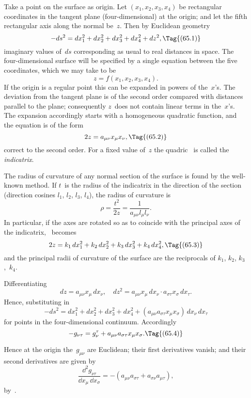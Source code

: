 \documentclass[12pt]{book}
\begin{document}
Take a point on the surface as origin. Let $(x_{1}, x_{2}, x_{3}, x_{4})$ be rectangular
coordinates in the tangent plane (four\hyp{}dimensional) at the origin; and let the
fifth rectangular axis along the normal be~$z$. Then by Euclidean geometry
\[
-ds^{2} = dx_{1}^{2} + dx_{2}^{2} + dx_{3}^{2} + dx_{4}^{2} + dz^{2},
\Tag{(65.1)}
\]
imaginary values of~$ds$ corresponding as usual to real distances in space. The
four\hyp{}dimensional surface will be specified by a single equation between the
five coordinates, which we may take to be
\[
z = f(x_{1}, x_{2}, x_{3}, x_{4}).
\]
If the origin is a regular point this can be expanded in powers of the~$x$'s. The
deviation from the tangent plane is of the second order compared with distances
parallel to the plane; consequently $z$~does not contain linear terms in
the~$x$'s. The expansion accordingly starts with a homogeneous quadratic
function, and the equation is of the form
\[
2z = a_{\mu\nu} x_{\mu} x_{\nu},
\Tag{(65.2)}
\]
correct to the second order. For a fixed value of~$z$ the quadric~ is called
the \emph{indicatrix}.
%

The radius of curvature of any normal section of the surface is found by
the well-known method. If $t$~is the radius of the indicatrix in the direction of
the section (direction cosines $l_{1}$, $l_{2}$, $l_{3}$, $l_{4}$), the radius of curvature is
\[
\rho = \frac{t^{2}}{2z} = \frac{1}{a_{\mu\nu} l_{\mu} l_{\nu}}.
\]
In particular, if the axes are rotated so as to coincide with the principal axes
of the indicatrix, ~becomes
\[
2z = k_{1}\, dx_{1}^{2} + k_{2}\, dx_{2}^{2} + k_{3}\, dx_{3}^{2} + k_{4}\, dx_{4}^{2},
\Tag{(65.3)}
\]
and the principal radii of curvature of the surface are the reciprocals of
$k_{1}$, $k_{2}$, $k_{3}$,~$k_{4}$.

Differentiating~
\[
dz = a_{\mu\nu} x_{\mu}\, dx_{\nu},\quad
dz^{2} = a_{\mu\nu} x_{\mu}\, dx_{\nu} \cdot a_{\sigma\tau} x_{\sigma}\, dx_{\tau}.
\]
Hence, substituting in~
\[
-ds^{2} = dx_{1}^{2} + dx_{2}^{2} + dx_{3}^{2} + dx_{4}^{2}
+ (a_{\mu\nu} a_{\sigma\tau} x_{\mu} x_{\sigma})\, dx_{\nu}\, dx_{\tau}
\]
for points in the four\hyp{}dimensional continuum. Accordingly
\[
-g_{\nu\tau} = g_{\nu}^{\tau} + a_{\mu\nu} a_{\sigma\tau} x_{\mu} x_{\sigma}.
\Tag{(65.4)}
\]

Hence at the origin the~$g_{\mu\nu}$ are Euclidean; their first derivatives vanish;
and their second derivatives are given by
\[
\frac{\dd^{2} g_{\nu\tau}}{\dd x_{\mu}\, \dd x_{\sigma}}
= -(a_{\mu\nu} a_{\sigma\tau} + a_{\sigma\nu} a_{\mu\tau}),
\]
by~.
\end{document}
